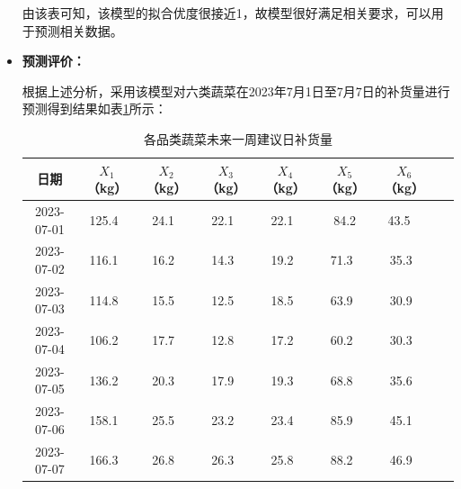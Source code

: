 \documentclass{my_paper}
\begin{document}
\begin{itemize}
    由该表可知，该模型的拟合优度很接近1，故模型很好满足相关要求，可以用于预测相关数据。
    \item \textbf{预测评价：}\par
    根据上述分析，采用该模型对六类蔬菜在2023年7月1日至7月7日的补货量进行预测得到结果如表\ref{各品类蔬菜未来一周建议日补货量}所示：
    \begin{table}[H]
    \centering
    \caption{各品类蔬菜未来一周建议日补货量}
    \begin{tabular}{cccccccc}
    \toprule
        日期 & $X_1$（kg） & $X_2$（kg） & $X_3$（kg） & $X_4$（kg） & $X_5$（kg） & $X_6$（kg） & ~ \\
        \midrule
        2023-07-01 & 125.4~ & 24.1~ & 22.1~ & 22.1~ & 84.2  &   43.5 ~  \\ 
        2023-07-02 & 116.1~ & 16.2~ & 14.3~ & 19.2~ & 71.3~ &   35.3~ \\ 
        2023-07-03 & 114.8~ & 15.5~ & 12.5~ & 18.5~ & 63.9~ &   30.9~ \\ 
        2023-07-04 & 106.2~ & 17.7~ & 12.8~ & 17.2~ & 60.2~ &   30.3~ \\ 
        2023-07-05 & 136.2~ & 20.3~ & 17.9~ & 19.3~ & 68.8~ &   35.6~ \\ 
        2023-07-06 & 158.1~ & 25.5~ & 23.2~ & 23.4~ & 85.9~ &   45.1~ \\ 
        2023-07-07 & 166.3~ & 26.8~ & 26.3~ & 25.8~ & 88.2~ &   46.9~ \\ 
        \bottomrule
    \end{tabular}
    \label{各品类蔬菜未来一周建议日补货量}
\end{table}
\end{itemize}
\end{document}
